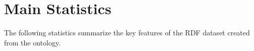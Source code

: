 \documentclass{article}
\begin{document}
\section*{Main Statistics}

The following statistics summarize the key features of the RDF dataset created from the ontology.
\end{document}
